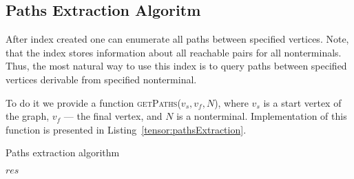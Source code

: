 \subsection{Paths Extraction Algoritm}

After index created one can enumerate all paths between specified vertices.
Note, that the index stores information about all reachable pairs for all nonterminals.
Thus, the most natural way to use this index is to query paths between specified vertices derivable from specified nonterminal. 

To do it we provide a function \textsc{getPaths}($v_s, v_f, N$), where $v_s$ is a start vertex of the graph, $v_f$ --- the final vertex, and $N$ is a nonterminal. 
Implementation of this function is presented in Listing~\ref{tensor:pathsExtraction}.

\begin{algorithm}[h]
\begin{algorithmic}[1]
\footnotesize
\caption{Paths extraction algorithm}
\label{tensor:pathsExtraction}

\State \Return $res$
\EndFunction




\end{algorithmic}
\end{algorithm}
